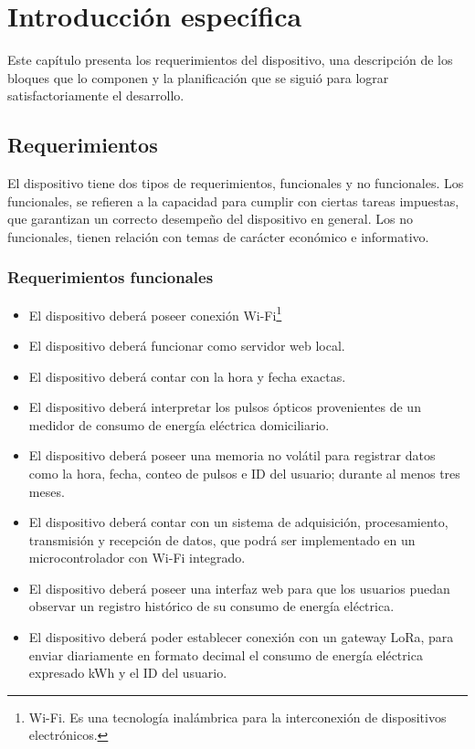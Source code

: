 \chapter{Introducción específica} %

\label{Chapter2}


Este capítulo presenta los requerimientos del dispositivo, una descripción de los bloques que lo componen y la planificación que se siguió para lograr satisfactoriamente el desarrollo.


\section{Requerimientos}

El dispositivo tiene dos tipos de requerimientos, funcionales y no funcionales. Los funcionales, se refieren a la capacidad para cumplir con ciertas tareas impuestas, que garantizan un correcto desempeño del dispositivo en general. Los no funcionales, tienen relación con temas de carácter económico e informativo.

\subsection{Requerimientos funcionales}

\begin{itemize}
	\item El dispositivo deberá poseer conexión Wi-Fi\footnote{Wi-Fi. Es una tecnología inalámbrica para la interconexión de dispositivos electrónicos.}
	\item El dispositivo deberá funcionar como servidor web local.
	\item El dispositivo deberá contar con la hora y fecha exactas.
	\item El dispositivo deberá interpretar los pulsos ópticos provenientes de un medidor de consumo de energía eléctrica domiciliario.
	\item El dispositivo deberá poseer una memoria no volátil para registrar datos como la hora, fecha, conteo de pulsos e ID del usuario; durante al menos tres meses.
	\item El dispositivo deberá contar con un sistema de adquisición, procesamiento, transmisión y recepción de datos, que podrá ser implementado en un microcontrolador con Wi-Fi integrado.
	\item El dispositivo deberá poseer una interfaz web para que los usuarios puedan observar un registro histórico de su consumo de energía eléctrica.
	\item El dispositivo deberá poder establecer conexión con un gateway LoRa, para enviar diariamente en formato decimal el consumo de energía eléctrica expresado kWh y el ID del usuario.
\end{itemize}

